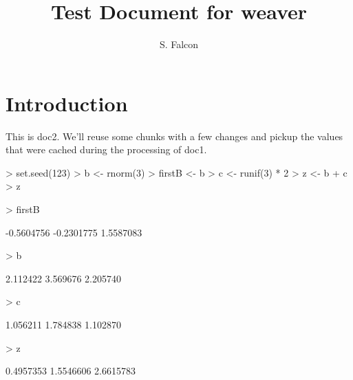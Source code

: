 \documentclass[11pt]{article}
\title{Test Document for weaver}
\author{S. Falcon}
\begin{document}
\maketitle

\section{Introduction}

This is doc2.  We'll reuse some chunks with a few changes and pickup
the values that were cached during the processing of doc1.

\begin{Schunk}
\begin{Sinput}
> set.seed(123)
> b <- rnorm(3)
> firstB <- b
> c <- runif(3) * 2
> z <- b + c
> z
\end{Sinput}
\end{Schunk}


\begin{Schunk}
\begin{Sinput}
> firstB
\end{Sinput}
\begin{Soutput}
[1] -0.5604756 -0.2301775  1.5587083
\end{Soutput}
\begin{Sinput}
> b
\end{Sinput}
\begin{Soutput}
[1] 2.112422 3.569676 2.205740
\end{Soutput}
\begin{Sinput}
> c
\end{Sinput}
\begin{Soutput}
[1] 1.056211 1.784838 1.102870
\end{Soutput}
\begin{Sinput}
> z
\end{Sinput}
\begin{Soutput}
[1] 0.4957353 1.5546606 2.6615783
\end{Soutput}
\end{Schunk}
\end{document}
